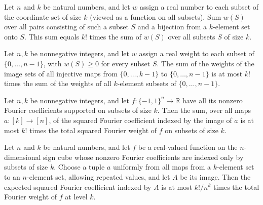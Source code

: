 \begin{theorem}
\label{FABL.sum_injectiveLabelCodeTarget}
\leanok
{}
Let $n$ and $k$ be natural numbers, and let $w$ assign a real number to each subset of
the coordinate set of size $k$ (viewed as a function on all subsets). Sum $w(S)$ over
all pairs consisting of such a subset $S$ and a bijection from a $k$-element set onto
$S$. This sum equals $k!$ times the sum of $w(S)$ over all subsets $S$ of size $k$.
\end{theorem}

\begin{theorem}
\label{FABL.sum_injectiveLabelTuple_le_factorial_mul}
\leanok
{}
Let $n,k$ be nonnegative integers, and let $w$ assign a real weight to each subset of
$\{0,\ldots,n-1\}$, with $w(S)\ge 0$ for every subset $S$. The sum of the weights of
the image sets of all injective maps from $\{0,\ldots,k-1\}$ to $\{0,\ldots,n-1\}$
is at most $k!$ times the sum of the weights of all $k$-element subsets of
$\{0,\ldots,n-1\}$.
\end{theorem}

\begin{theorem}
\label{FABL.sum_labelTuple_fourierCoeff_sq_le}
\leanok
{}
Let $n,k$ be nonnegative integers, and let $f:\{-1,1\}^n\to\mathbb R$ have all its
nonzero Fourier coefficients supported on subsets of size $k$. Then the sum, over all
maps $a:[k]\to[n]$, of the squared Fourier coefficient indexed by the image of $a$ is at
most $k!$ times the total squared Fourier weight of $f$ on subsets of size $k$.
\end{theorem}

\begin{theorem}
\label{FABL.expect_labelTuple_fourierCoeff_sq_le}
\leanok
{}
Let $n$ and $k$ be natural numbers, and let $f$ be a real-valued function on the
$n$-dimensional sign cube whose nonzero Fourier coefficients are indexed only by subsets
of size $k$. Choose a tuple $a$ uniformly from all maps from a $k$-element set to an
$n$-element set, allowing repeated values, and let $A$ be its image. Then the expected
squared Fourier coefficient indexed by $A$ is at most $k!/n^k$ times the total Fourier
weight of $f$ at level $k$.
\end{theorem}

